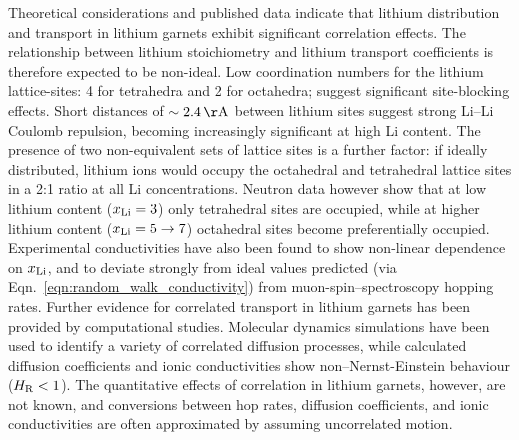 \documentclass[aps,prb,twocolumn,superscriptaddress,reprint]{revtex4-1}
\newcommand{\xLi}{x_\m{Li}}
\begin{document}
Theoretical considerations and published data indicate that lithium distribution and transport in lithium garnets exhibit significant correlation effects. 
The relationship between lithium stoichiometry and lithium transport coefficients is therefore expected to be non-ideal. 
Low coordination numbers for the lithium lattice-sites: 4 for tetrahedra and 2 for octahedra; suggest significant site-blocking effects.\cite{AwakaEtAl_ChemLett2011} Short distances of $\sim2.4\u{\AA}$ between lithium sites suggest strong Li--Li Coulomb repulsion, becoming increasingly significant at high Li content.\cite{OCallaghanAndCussen_ChemComm2007,OCallaghanAndCussen_SolStatSci2008,Cussen_JMaterChem2010,WangEtAl_SolStatIonics2014} The presence of two non-equivalent sets of lattice sites is a further factor: if ideally distributed, lithium ions would occupy the octahedral and tetrahedral lattice sites in a 2:1 ratio at all Li concentrations. 
Neutron data however show that at low lithium content ($\xLi=3$) only tetrahedral sites are occupied,\cite{OCallaghanEtAl_ChemMater2006} while at higher lithium content ($\xLi=5\to7$) octahedral sites become preferentially occupied.\cite{Cussen_JMaterChem2010,ThangaduraiEtAl_JPhysChemLett2015} Experimental conductivities have also been found to show non-linear dependence on $\xLi$,\cite{ThompsonEtAl_AdvEnergyMater2015} and to deviate strongly from ideal values predicted (via Eqn.~\ref{eqn:random_walk_conductivity}) from muon-spin--spectroscopy hopping rates.\cite{NozakiEtAl_SolStatIonics2014} Further evidence for correlated transport in lithium garnets has been provided by computational studies. 
Molecular dynamics simulations have been used to identify a variety of correlated diffusion processes,\cite{JalemEtAl_ChemMater2013, MeierEtAl_JPhysChemC2014,KlenkAndLai_PhysChemChemPhys2015, BurbanoEtAl_PhysRevLett2016} while calculated diffusion coefficients and ionic conductivities show non--Nernst-Einstein behaviour ($H_{\mathrm{R}}<1$).\cite{KlenkAndLai_SolStatIonics2016, Burbano_Garnets_InPreparation} The quantitative effects of correlation in lithium garnets, however, are not known, and conversions between hop rates, diffusion coefficients, and ionic conductivities are often approximated by assuming uncorrelated motion.\cite{KuhnEtAl_PhysRevB2011,KuhnEtAl_JPhys-CondensMat2011,MiaraEtAl_ChemMater2013,Rustad_arXiv2016,GuEtAl_SolStatIonics2015,NozakiEtAl_SolStatIonics2014,ZeierEtAl_ACSApplMaterInt2014,JalemEtAl_ChemMater2013,AdamsAndRao_JMaterChem2012,DuvelEtAl_JPhysChemC2012,NarayananEtAl_RSCAdv2012,RamzyAndThangadurai_ACSApplMaterInt2010,AmoresEtAl_JMaterChemA2016}
\end{document}
